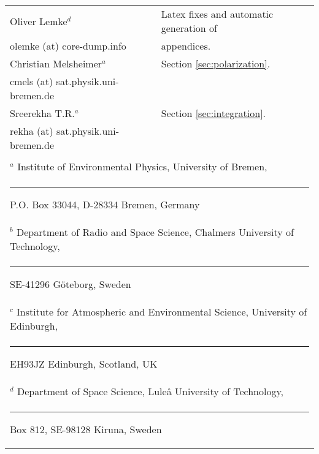\begin{center}
\begin{tabular}{lp{10mm}l}
\hline
  Oliver Lemke$^d$ & & Latex fixes and automatic generation of\\
  olemke (at) core-dump.info & & appendices.\\
\hline
  Christian Melsheimer$^a$ & & Section \ref{sec:polarization}.\\
  cmels (at) sat.physik.uni-bremen.de & & \\
\hline
  Sreerekha T.R.$^a$ & & Section \ref{sec:integration}.\\
  rekha (at) sat.physik.uni-bremen.de & & \\
\hline
 && \\
\multicolumn{3}{l}{ $^a$
      Institute of Environmental Physics, University of Bremen, } \\
\multicolumn{3}{l}{\rule{1.5ex}{0pt}P.O. Box 33044, D-28334 Bremen, Germany} \\
\multicolumn{3}{l}{ $^b$
      Department of Radio and Space Science, 
      Chalmers University of Technology,} \\
\multicolumn{3}{l}{\rule{1.5ex}{0pt}SE-41296 G\"oteborg, Sweden} \\
\multicolumn{3}{l}{ $^c$
      Institute for Atmospheric and Environmental Science, 
      University of Edinburgh,} \\
\multicolumn{3}{l}{\rule{1.5ex}{0pt}EH93JZ Edinburgh, Scotland, UK} \\
\multicolumn{3}{l}{ $^d$
      Department of Space Science, Lule{\aa} University of Technology, } \\
\multicolumn{3}{l}{\rule{1.5ex}{0pt}Box 812, SE-98128 Kiruna, Sweden} \\

\end{tabular}
\end{center}



%
\newpage
\thispagestyle{empty}
\rule{0pt}{10pt}
\newpage

\tableofcontents

\cleardoublepage
{}
     

